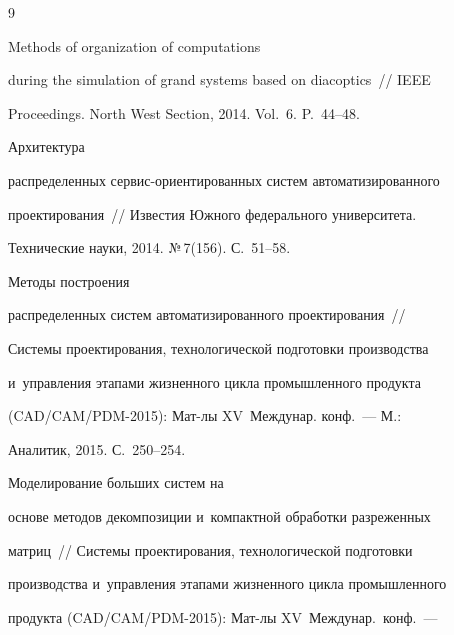 {\small\frenchspacing


{%




\begin{thebibliography}{9}





\vspace*{-2pt}







 Methods of organization of computations 


during the simulation of grand systems based on diacoptics~/\!\!/ IEEE 


Proceedings. North West Section, 2014. Vol.~6. P.~44--48.




 Архитектура 


распределенных сер\-вис-ори\-ен\-ти\-ро\-ван\-ных сис\-тем автоматизированного 


проектирования~/\!\!/ Известия Южного федерального университета. 


Технические науки, 2014. №\,7(156). С.~51--58.




 Методы построения 


распределенных систем автоматизированного проектирования~/\!\!/ 


Системы проектирования, технологической подготовки производства 


и~управления этапами жизненного цикла промышленного продукта 


(CAD/CAM/PDM-2015): Мат-лы XV~Междунар. конф.~--- М.: 


Аналитик, 2015. С.~250--254.




 Моделирование больших систем на 


основе методов декомпозиции и~компактной обработки разреженных 


матриц~/\!\!/ Системы проектирования, технологической подготовки 


производства и~управления этапами жизненного цикла промышленного 


продукта (CAD/CAM/PDM-2015): Мат-лы XV~Междунар.\ конф.~--- 



\end{thebibliography}}}
